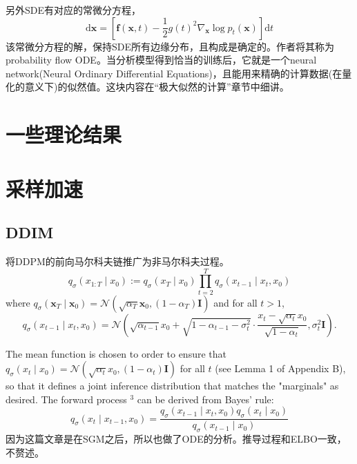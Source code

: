另外SDE有对应的常微分方程，
\begin{equation}
\mathrm{d} \mathbf{x}=\left[\mathbf{f}(\mathbf{x}, t)-\frac{1}{2} g(t)^2 \nabla_{\mathbf{x}} \log p_t(\mathbf{x})\right] \mathrm{d} t
\end{equation}
该常微分方程的解，保持SDE所有边缘分布，且构成是确定的。作者将其称为probability flow ODE。当分析模型得到恰当的训练后，它就是一个neural network(Neural Ordinary Differential Equations)，且能用来精确的计算数据(在量化的意义下)的似然值。这块内容在“极大似然的计算”章节中细讲。

\section{一些理论结果}

\section{采样加速}
\subsection{DDIM}
将DDPM的前向马尔科夫链推广为非马尔科夫过程。
$$
q_\sigma\left(x_{1: T} \mid x_0\right):=q_\sigma\left(x_T \mid x_0\right) \prod_{t=2}^T q_\sigma\left(x_{t-1} \mid x_t, x_0\right)
$$
where $q_\sigma\left(\boldsymbol{x}_T \mid \boldsymbol{x}_0\right)=\mathcal{N}\left(\sqrt{\alpha_T} \boldsymbol{x}_0,\left(1-\alpha_T\right) \boldsymbol{I}\right)$ and for all $t>1$,
$$
q_\sigma\left(x_{t-1} \mid x_t, x_0\right)=\mathcal{N}\left(\sqrt{\alpha_{t-1}} x_0+\sqrt{1-\alpha_{t-1}-\sigma_t^2} \cdot \frac{x_t-\sqrt{\alpha_t} x_0}{\sqrt{1-\alpha_t}}, \sigma_t^2 \boldsymbol{I}\right) .
$$

The mean function is chosen to order to ensure that $q_\sigma\left(x_t \mid x_0\right)=\mathcal{N}\left(\sqrt{\alpha_t} x_0,\left(1-\alpha_t\right) \boldsymbol{I}\right)$ for all $t$ (see Lemma 1 of Appendix B), so that it defines a joint
inference distribution that matches the "marginals" as desired. The forward process ${ }^3$ can be derived from Bayes' rule:
$$
q_\sigma\left(x_t \mid x_{t-1}, x_0\right)=\frac{q_\sigma\left(x_{t-1} \mid x_t, x_0\right) q_\sigma\left(x_t \mid x_0\right)}{q_\sigma\left(x_{t-1} \mid x_0\right)}
$$
因为这篇文章是在SGM之后，所以也做了ODE的分析。推导过程和ELBO一致，不赘述。

